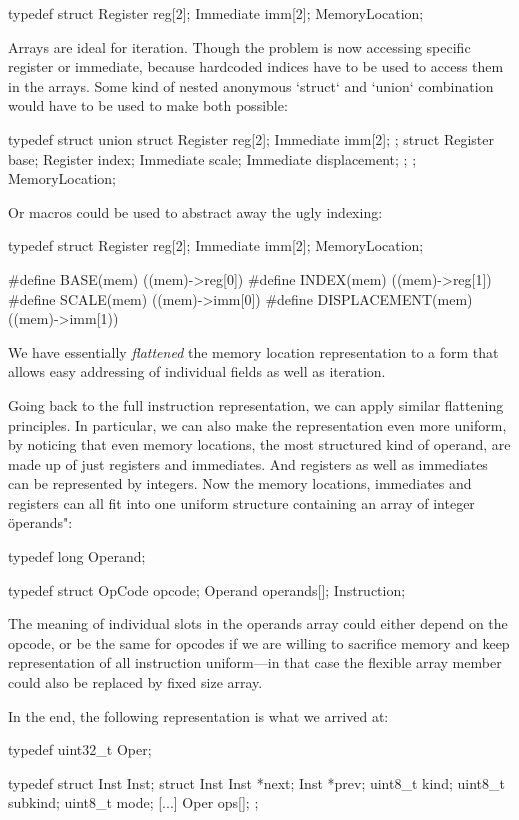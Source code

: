 \begtt
typedef struct {
	Register reg[2];
	Immediate imm[2];
} MemoryLocation;
\endtt

Arrays are ideal for iteration. Though the problem is now accessing specific
register or immediate, because hardcoded indices have to be used to access them
in the arrays. Some kind of nested anonymous `struct` and `union` combination
would have to be used to make both possible:

\begtt
typedef struct {
	union {
		struct {
			Register reg[2];
			Immediate imm[2];
		};
		struct {
			Register base;
			Register index;
			Immediate scale;
			Immediate displacement;
		};
	};
} MemoryLocation;
\endtt

Or macros could be used to abstract away the ugly indexing:

\begtt
typedef struct {
	Register reg[2];
	Immediate imm[2];
} MemoryLocation;

#define BASE(mem)         ((mem)->reg[0])
#define INDEX(mem)        ((mem)->reg[1])
#define SCALE(mem)        ((mem)->imm[0])
#define DISPLACEMENT(mem) ((mem)->imm[1))
\endtt

We have essentially {\em flattened} the memory location representation to a form
that allows easy addressing of individual fields as well as iteration.

Going back to the full instruction representation, we can apply similar
flattening principles. In particular, we can also make the representation even
more uniform, by noticing that even memory locations, the most structured kind
of operand, are made up of just registers and immediates. And registers as well
as immediates can be represented by integers. Now the memory locations,
immediates and registers can all fit into one uniform structure containing an
array of integer \"operands":

\begtt
typedef long Operand;

typedef struct {
	OpCode opcode;
	Operand operands[];
} Instruction;
\endtt

The meaning of individual slots in the operands array could either depend on the
opcode, or be the same for opcodes if we are willing to sacrifice memory and
keep representation of all instruction uniform---in that case the flexible array
member could also be replaced by fixed size array.

In the end, the following representation is what we arrived at:

\begtt
typedef uint32_t Oper;

typedef struct Inst Inst;
struct Inst {
	Inst *next;
	Inst *prev;
	uint8_t kind;
	uint8_t subkind;
	uint8_t mode;
	[...]
	Oper ops[];
};
\endtt

